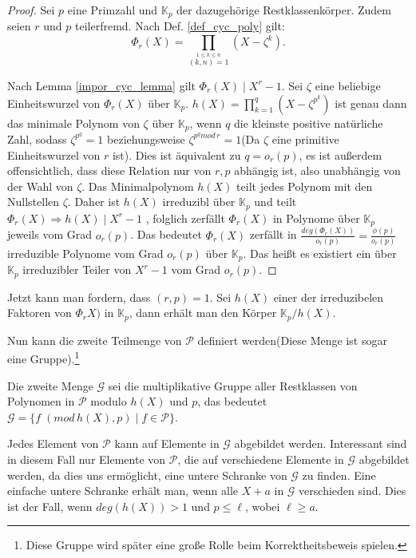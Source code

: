 \documentclass[12pt,oneside]{article}
\theoremstyle{remark}
\theoremstyle{definition}
\begin{document}
\begin{flushleft}
\begin{proof}
    Sei $p$ eine Primzahl und $\mathbb{K}_{p}$ der dazugehörige Restklassenkörper. Zudem seien $r$ und $p$ teilerfremd. Nach Def. \ref{def_cyc_poly} gilt: 
    \begin{equation}\label{rth_cy}
        \Phi _{r}(X)=\prod _{\stackrel {1\leq k\leq n}{(k,n)=1}}\left(X- \zeta^k\right).
    \end{equation}
    
Nach Lemma \ref{impor_cyc_lemma} gilt $\Phi_{r}(X) \mid  X^{r} - 1$. Sei $\zeta$ eine beliebige Einheitswurzel von $\Phi_r(X)$  über $\mathbb{K}_p$. $h(X) = \prod_{k = 1}^{q} (X - \zeta^{p^k})$ ist genau dann das minimale Polynom von $\zeta$ über $\mathbb{K}_p$, wenn $q$ die kleinste positive natürliche Zahl, sodass $\zeta^{p^q} = 1$ beziehungsweise $\zeta^{p^q mod \, r} = 1$(Da $\zeta$ eine primitive Einheitswurzel von $r$ ist). Dies ist äquivalent zu $q = o_r(p)$, es ist außerdem offensichtlich, dass diese Relation nur von $r,p$ abhängig ist, also unabhängig von der Wahl von $\zeta$. Das Minimalpolynom $h(X)$ teilt jedes Polynom mit den Nullstellen $\zeta$. Daher ist $h(X)$ irreduzibl über $\mathbb{K}_p$ und teilt $\Phi_{r}(X) \Rightarrow h(X) \mid X^r - 1$ , folglich zerfällt $\Phi_r(X)$ in Polynome über $\mathbb{K}_p$ jeweils vom Grad $o_r(p)$. Das bedeutet $\Phi_{r}(X)$ zerfällt in $\frac{deg(\Phi_{r}(X))}{o_r(p)} = \frac{\phi(p)}{o_r(p)}$ irreduzible Polynome vom Grad $o_r(p)$ über $\mathbb{K}_p$. Das heißt es existiert ein über $\mathbb{K}_p$ irreduzibler Teiler von $X^r - 1$ vom Grad $o_r(p)$.              
\end{proof}

Jetzt kann man fordern, dass $(r,p) = 1$. Sei $h(X)$ einer der irreduzibelen Faktoren von $\Phi_{r}X)$ in $\mathbb{K}_p$, dann erhält man den Körper $\mathbb{K}_p/h(X)$.

Nun kann die zweite Teilmenge von $\mathcal{P}$ definiert werden(Diese Menge ist sogar eine Gruppe).\footnote{Diese Gruppe wird später eine große Rolle beim Korrektheitsbeweis spielen.}\newline


Die zweite Menge $\mathcal{G}$ sei die multiplikative Gruppe aller Restklassen von Polynomen in $\mathcal{P}$ modulo $h(X)$ und $p$, das bedeutet $\mathcal{G} = \{f \; (mod \, h(X), p) \mid f \in \mathcal{P} \}$.\newline

Jedes Element von $\mathcal{P}$ kann auf Elemente in $\mathcal{G}$ abgebildet werden. Interessant sind in diesem Fall nur Elemente von $\mathcal{P}$, die auf verschiedene Elemente in $\mathcal{G}$ abgebildet werden, da dies uns ermöglicht, eine untere Schranke von $\mathcal{G}$ zu finden. Eine einfache untere Schranke erhält man, wenn alle $X + a$ in $\mathcal{G}$ verschieden sind. Dies ist der Fall, wenn $deg(h(X)) > 1$ und $p \leq \ell$, wobei $\ell \geq a$.


\end{flushleft}
\end{document}

